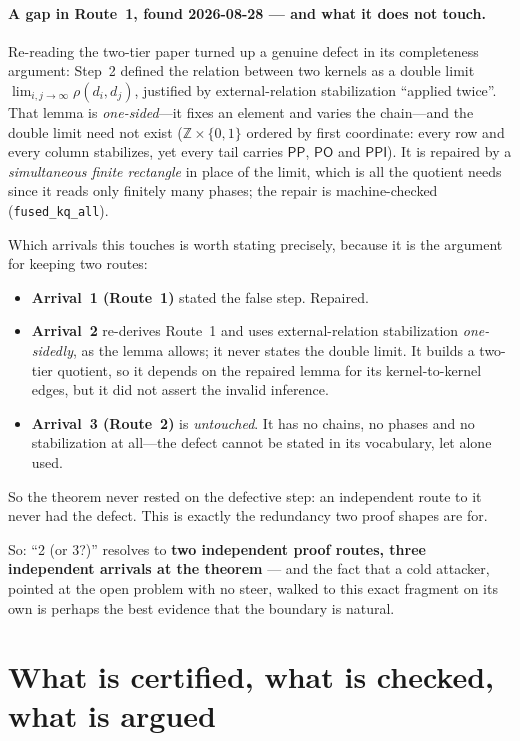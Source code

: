 \documentclass[11pt]{article}
\newcommand{\PO}{\ensuremath{\mathsf{PO}}}
\newcommand{\PP}{\ensuremath{\mathsf{PP}}}
\newcommand{\PPI}{\ensuremath{\mathsf{PPI}}}
\newcommand{\code}[1]{\texttt{#1}}
\begin{document}
\paragraph{A gap in Route~1, found 2026-08-28 --- and what it does not
touch.} Re-reading the two-tier paper turned up a genuine defect in its
completeness argument: Step~2 defined the relation between two kernels as a
double limit $\lim_{i,j\to\infty}\rho(d_i,d_j)$, justified by external-relation
stabilization ``applied twice''. That lemma is \emph{one-sided}---it fixes an
element and varies the chain---and the double limit need not exist
($\mathbb{Z}\times\{0,1\}$ ordered by first coordinate: every row and every
column stabilizes, yet every tail carries $\PP$, $\PO$ and $\PPI$). It is
repaired by a \emph{simultaneous finite rectangle} in place of the limit, which
is all the quotient needs since it reads only finitely many phases; the repair is
machine-checked (\code{fused\_kq\_all}).

Which arrivals this touches is worth stating precisely, because it is the
argument for keeping two routes:
\begin{itemize}
\item \textbf{Arrival~1 (Route~1)} stated the false step. Repaired.
\item \textbf{Arrival~2} re-derives Route~1 and uses external-relation
  stabilization \emph{one-sidedly}, as the lemma allows; it never states the
  double limit. It builds a two-tier quotient, so it depends on the repaired
  lemma for its kernel-to-kernel edges, but it did not assert the invalid
  inference.
\item \textbf{Arrival~3 (Route~2)} is \emph{untouched}. It has no chains, no
  phases and no stabilization at all---the defect cannot be stated in its
  vocabulary, let alone used.
\end{itemize}
So the theorem never rested on the defective step: an independent route to it
never had the defect. This is exactly the redundancy two proof shapes are for.

So: ``2 (or 3?)'' resolves to \textbf{two independent proof routes,
three independent arrivals at the theorem} --- and the fact that a cold
attacker, pointed at the open problem with no steer, walked to this
exact fragment on its own is perhaps the best evidence that the
boundary is natural.

\section{What is certified, what is checked, what is
argued}\label{sec:status}
\end{document}

